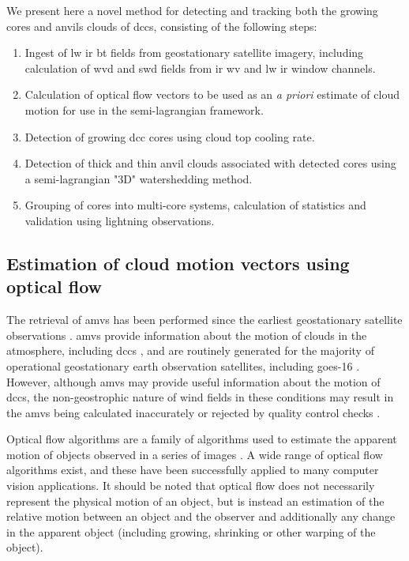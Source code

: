 We present here a novel method for detecting and tracking both the growing cores and anvils clouds of \acrshort{dcc}s, consisting of the following steps:

\begin{enumerate}
    \item Ingest of \acrshort{lw} \acrshort{ir} \acrshort{bt} fields from geostationary satellite imagery, including calculation of \acrshort{wvd} and \acrshort{swd} fields from \acrshort{ir} \acrshort{wv} and \acrshort{lw} \acrshort{ir} window channels.
    \item Calculation of optical flow vectors to be used as an \textit{a priori} estimate of cloud motion for use in the semi-lagrangian framework.
    \item Detection of growing \acrshort{dcc} cores using cloud top cooling rate.
    \item Detection of thick and thin anvil clouds associated with detected cores using a semi-lagrangian "3D" watershedding method. 
    \item Grouping of cores into multi-core systems, calculation of statistics and validation using lightning observations.
\end{enumerate}



\subsection{Estimation of cloud motion vectors using optical flow} \label{sec:optical_flow}

The retrieval of \acrshort{amv}s has been performed since the earliest geostationary satellite observations \citep{menzel_cloud_2001}.
\acrshort{amv}s provide information about the motion of clouds in the atmosphere, including \acrshort{dcc}s \citep{bedka_application_2005}, and are routinely generated for the majority of operational geostationary earth observation satellites, including \acrshort{goes}-16 \citep{daniels_algorithm_nodate}. 
However, although \acrshort{amv}s may provide useful information about the motion of \acrshort{dcc}s, the non-geostrophic nature of wind fields in these conditions may result in the \acrshort{amv}s being calculated inaccurately or rejected by quality control checks \citep{bedka_application_2005}.

Optical flow algorithms are a family of algorithms used to estimate the apparent motion of objects observed in a series of images \citep{aggarwal_computation_1988}. 
A wide range of optical flow algorithms exist, and these have been successfully applied to many computer vision applications. 
It should be noted that optical flow does not necessarily represent the physical motion of an object, but is instead an estimation of the relative motion between an object and the observer and additionally any change in the apparent object (including growing, shrinking or other warping of the object). 

